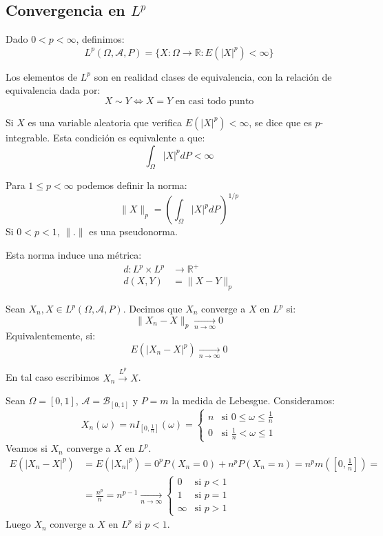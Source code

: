 \subsection*{Convergencia en $L^p$}
Dado $0 < p < \infty$, definimos:
$$L^p(\Omega, \mathcal{A}, P) = \{X: \Omega \to \mathbb{R} : E(|X|^p) < \infty\}$$

\begin{note}
    Los elementos de $L^p$ son en realidad clases de equivalencia, con la relación de equivalencia dada por:
    $$X \sim Y \Leftrightarrow X = Y \text{ en casi todo punto}$$
\end{note}

\begin{note}
    Si $X$ es una variable aleatoria que verifica $E(|X|^p) < \infty$, se dice que es $p$-integrable.
    Esta condición es equivalente a que:
    $$\int_\Omega |X|^p dP < \infty$$
\end{note}

Para $1 \leq p < \infty$ podemos definir la norma:
$$\|X\|_p = \left(\int_\Omega |X|^p dP\right)^{1/p}$$
Si $0 < p < 1$, $\|.\|$ es una pseudonorma.

Esta norma induce una métrica:
\begin{align*}
    d: L^p \times L^p & \to \mathbb{R}^+ \\
    d(X, Y)           & = \|X-Y\|_p
\end{align*}

\begin{definition}
    Sean $X_n, X \in L^p(\Omega, \mathcal{A}, P)$.
    Decimos que $X_n$ converge a $X$ en $L^p$ si:
    $$\|X_n - X\|_p \xrightarrow[n \to \infty]{} 0$$
    Equivalentemente, si:
    $$E(|X_n - X|^p) \xrightarrow[n \to \infty]{} 0$$

    En tal caso escribimos $X_n \xrightarrow{L^p} X$.
\end{definition}

\begin{example}
    Sean $\Omega = [0, 1]$, $\mathcal{A} = \mathcal{B}_{[0, 1]}$ y $P = m$ la medida de Lebesgue.
    Consideramos:
    $$X_n(\omega) = n I_{[0, \frac{1}{n}]}(\omega) = \begin{cases}
            n & \text{si } 0 \leq \omega \leq \frac{1}{n} \\
            0 & \text{si } \frac{1}{n} < \omega \leq 1
        \end{cases}$$
    Veamos si $X_n$ converge a $X$ en $L^p$.
    \begin{align*}
        E(|X_n - X|^p) & = E(|X_n|^p) = 0^pP(X_n = 0) + n^pP(X_n = n) = n^pm\left(\left[0, \frac{1}{n}\right]\right) = \\
                       & = \frac{n^p}{n} = n^{p-1} \xrightarrow[n \to \infty]{} \begin{cases}
            0      & \text{si } p < 1 \\
            1      & \text{si } p = 1 \\
            \infty & \text{si } p > 1
        \end{cases}
    \end{align*}
    Luego $X_n$ converge a $X$ en $L^p$ si $p < 1$.
\end{example}

